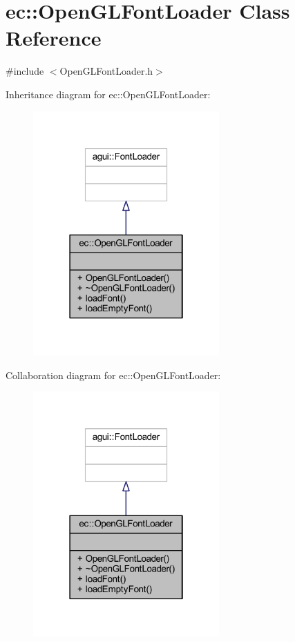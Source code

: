 \hypertarget{classec_1_1_open_g_l_font_loader}{}\section{ec\+:\+:Open\+G\+L\+Font\+Loader Class Reference}
\label{classec_1_1_open_g_l_font_loader}


{\ttfamily \#include $<$Open\+G\+L\+Font\+Loader.\+h$>$}



Inheritance diagram for ec\+:\+:Open\+G\+L\+Font\+Loader\+:\nopagebreak
\begin{figure}[H]
\begin{center}
\leavevmode
\includegraphics[width=202pt]{classec_1_1_open_g_l_font_loader__inherit__graph}
\end{center}
\end{figure}


Collaboration diagram for ec\+:\+:Open\+G\+L\+Font\+Loader\+:\nopagebreak
\begin{figure}[H]
\begin{center}
\leavevmode
\includegraphics[width=202pt]{classec_1_1_open_g_l_font_loader__coll__graph}
\end{center}
\end{figure}
